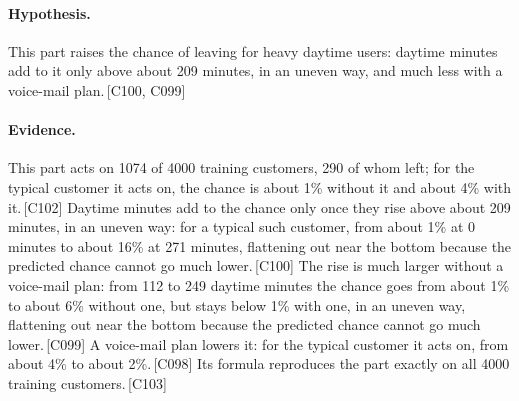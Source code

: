 \documentclass[a4paper,10pt]{article}
\newif\ifreviewmarks
\newcommand{\reviewrule}{\noindent{\color{BrickRed}\rule{\linewidth}{0.8pt}}}
\newenvironment{drafted}[1][]{%
  \ifreviewmarks\par\addvspace{\medskipamount}\reviewrule\par\nopagebreak
  \noindent{\color{BrickRed}\sffamily\footnotesize\textbf{Thesis Draft}\quad #1\hfill review}\par\nopagebreak\smallskip\fi}{%
  \ifreviewmarks\par\smallskip\noindent{\color{BrickRed}\sffamily\footnotesize end of thesis draft}\par\nopagebreak\reviewrule\par\medskip\fi}
\begin{document}
\begin{drafted}[plain-language layer: churn100-s4-c3]
\paragraph{Hypothesis.} This part raises the chance of leaving for heavy daytime users: daytime minutes add to it only above about 209 minutes, in an uneven way, and much less with a voice-mail plan.\,{\scriptsize\textcolor{NavyBlue}{[C100, C099]}}
\paragraph{Evidence.} This part acts on 1074 of 4000 training customers, 290 of whom left; for the typical customer it acts on, the chance is about 1\% without it and about 4\% with it.\,{\scriptsize\textcolor{NavyBlue}{[C102]}} Daytime minutes add to the chance only once they rise above about 209 minutes, in an uneven way: for a typical such customer, from about 1\% at 0 minutes to about 16\% at 271 minutes, flattening out near the bottom because the predicted chance cannot go much lower.\,{\scriptsize\textcolor{NavyBlue}{[C100]}} The rise is much larger without a voice-mail plan: from 112 to 249 daytime minutes the chance goes from about 1\% to about 6\% without one, but stays below 1\% with one, in an uneven way, flattening out near the bottom because the predicted chance cannot go much lower.\,{\scriptsize\textcolor{NavyBlue}{[C099]}} A voice-mail plan lowers it: for the typical customer it acts on, from about 4\% to about 2\%.\,{\scriptsize\textcolor{NavyBlue}{[C098]}} Its formula reproduces the part exactly on all 4000 training customers.\,{\scriptsize\textcolor{NavyBlue}{[C103]}}
\par{}
\par{}
\par{}

\end{drafted}
\end{document}
